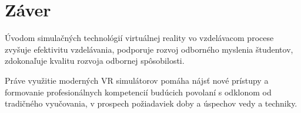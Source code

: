 \documentclass[10pt,twoside,slovak,a4paper]{article}
\begin{document}
\section{Záver} \label{zaver} 

Úvodom simulačných technológií virtuálnej reality vo vzdelávacom procese
zvyšuje efektivitu vzdelávania, podporuje rozvoj odborného myslenia študentov,
zdokonaľuje kvalitu rozvoja odbornej spôsobilosti.\vspace{5mm}

Práve využitie moderných VR simulátorov pomáha nájsť nové prístupy a
formovanie profesionálnych kompetencií budúcich povolaní s
odklonom od tradičného vyučovania, v prospech požiadaviek doby
a úspechov vedy a techniky.
\cite{lvov2019simulation}



 
\end{document}
